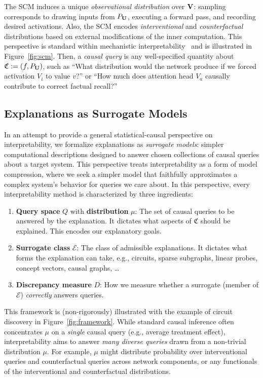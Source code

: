 The SCM induces a unique \emph{observational distribution} over $\mathbf{V}$: sampling corresponds to drawing inputs from $P_{\mathbf{U}}$, executing a forward pass, and recording desired activations. Also, the SCM encodes \emph{interventional} and \emph{counterfactual} distributions based on external modifications of the inner computation.
This perspective is standard within mechanistic interpretability~\citep{olah2018the,cammarata2020thread,pmlr-v162-geiger22a,geiger2025causalabstractiontheoreticalfoundation} and is illustrated in Figure~\ref{fig:scm}. Then, a \emph{causal query} is any well-specified quantity about $\mathfrak{C} := (f, P_{\mathbf{U}})$, such as ``What distribution would the network produce if we forced activation $V_i$ to value $v$?'' or ``How much does attention head $V_a$ causally contribute to correct factual recall?''



\subsection{Explanations as Surrogate Models}

In an attempt to provide a general statistical-causal perspective on interpretability, we formalize explanations as \emph{surrogate models}: simpler computational descriptions designed to answer chosen collections of causal queries about a target system. This perspective treats interpretability as a form of model compression, where we seek a simpler model that faithfully approximates a complex system's behavior for queries we care about. In this perspective, every interpretability method is characterized by three ingredients:
\begin{enumerate}
  \item \textbf{Query space} $Q$ with \textbf{distribution} $\mu$: The set of causal queries to be answered by the explanation. It dictates what aspects of $\mathfrak{C}$ should be explained. This encodes our explanatory goals.
  \item \textbf{Surrogate class} $\mathcal{E}$: The class of admissible explanations. It dictates what forms the explanation can take, e.g., circuits, sparse subgraphs, linear probes, concept vectors, causal graphs, \dots
  \item \textbf{Discrepancy measure} $D$: How we measure whether a surrogate (member of $\mathcal{E}$) \textit{correctly} answers queries.
\end{enumerate}
This framework is (non-rigorously) illustrated with the example of circuit discovery in Figure~\ref{fig:framework}.
% 
While standard causal inference often concentrates $\mu$ on a \emph{single} causal query (e.g., average treatment effect), interpretability aims to answer \emph{many diverse queries} drawn from a non-trivial distribution $\mu$.
For example, $\mu$ might distribute probability over interventional queries and counterfactual queries across network components, or any functionals of the interventional and counterfactual distributions. 



